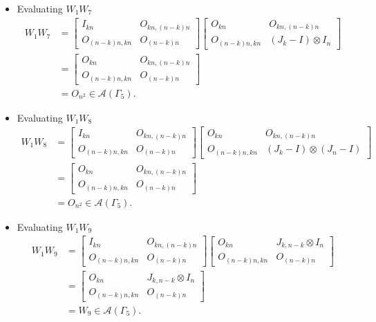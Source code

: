 \begin{itemize}
\item Evaluating $W_{1}W_{7}$
\begin{align*}
W_1W_7 &=
\begin{bmatrix}
I_{kn} & O_{kn, (n-k)n} \\
O_{(n-k)n,kn} & O_{(n-k)n}
\end{bmatrix}\begin{bmatrix}
O_{kn} & O_{kn, (n-k)n} \\
O_{(n-k)n,kn} & (J_k - I) \otimes I_n
\end{bmatrix}\\
&= \begin{bmatrix}
O_{kn} & O_{kn, (n-k)n} \\
O_{(n-k)n,kn} & O_{(n - k)n}
\end{bmatrix}\\
&= O_{n^2} \in\mathcal{A}(\Gamma_5).
\end{align*}

\item Evaluating $W_{1}W_{8}$
\begin{align*}
W_1W_8 &=
\begin{bmatrix}
I_{kn} & O_{kn, (n-k)n} \\
O_{(n-k)n,kn} & O_{(n-k)n}
\end{bmatrix}\begin{bmatrix}
O_{kn} & O_{kn, (n-k)n} \\
O_{(n-k)n,kn} & (J_k - I) \otimes (J_n-I)
\end{bmatrix}\\
&= \begin{bmatrix}
O_{kn} & O_{kn, (n-k)n} \\
O_{(n-k)n,kn} & O_{(n - k)n}
\end{bmatrix}\\
&= O_{n^2} \in\mathcal{A}(\Gamma_5).
\end{align*}

\item Evaluating $W_{1}W_{9}$
\begin{align*}
W_1W_9 &=
\begin{bmatrix}
I_{kn} & O_{kn, (n-k)n} \\
O_{(n-k)n,kn} & O_{(n-k)n}
\end{bmatrix}\begin{bmatrix}
O_{kn} & J_{k,n-k} \otimes I_n \\
O_{(n-k)n,kn} & O_{(n-k)n}
\end{bmatrix}\\
&= \begin{bmatrix}
O_{kn} & J_{k,n-k} \otimes I_n \\
O_{(n-k)n,kn} & O_{(n-k)n}
\end{bmatrix}\\
&= W_9 \in\mathcal{A}(\Gamma_5).
\end{align*}


\end{itemize}
